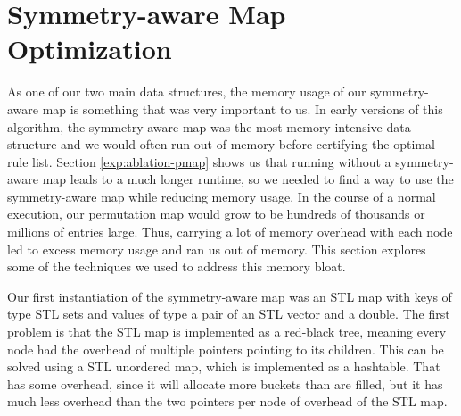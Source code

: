 \section{Symmetry-aware Map Optimization}
As one of our two main data structures, the memory usage of our symmetry-aware map is something that was very important to us.
In early versions of this algorithm, the symmetry-aware map was the most memory-intensive data structure and we would often run out of memory before certifying the optimal rule list.
Section \ref{exp:ablation-pmap} shows us that running without a symmetry-aware map leads to a much longer runtime, so we needed to find a way to use the symmetry-aware map while reducing memory usage. 
In the course of a normal execution, our permutation map would grow to be hundreds of thousands or millions of entries large.
Thus, carrying a lot of memory overhead with each node led to excess memory usage and ran us out of memory.
This section explores some of the techniques we used to address this memory bloat.

Our first instantiation of the symmetry-aware map was an STL map with keys of type STL sets and values of type a pair of an STL vector and a double.
The first problem is that the STL map is implemented as a red-black tree, meaning every node had the overhead of multiple pointers pointing to its children.
This can be solved using a STL unordered map, which is implemented as a hashtable.
That has some overhead, since it will allocate more buckets than are filled, but it has much less overhead than the two pointers per node of overhead of the STL map.

